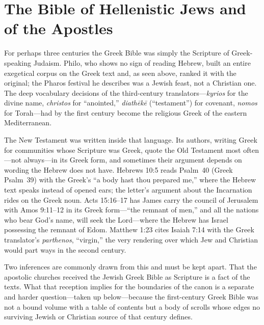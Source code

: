 \section{The Bible of Hellenistic Jews and of the Apostles}

For perhaps three centuries the Greek Bible was simply the Scripture of
Greek-speaking Judaism. Philo, who shows no sign of reading Hebrew, built
an entire exegetical corpus on the Greek text and, as seen above, ranked it
with the original; the Pharos festival he describes was a Jewish feast, not
a Christian one. The deep vocabulary decisions of the third-century
translators---\textit{kyrios} for the divine name, \textit{christos} for
``anointed,'' \textit{diath\=ek\=e} (``testament'') for covenant,
\textit{nomos} for Torah---had by the first century become the religious
Greek of the eastern Mediterranean.

The New Testament was written inside that language. Its authors, writing
Greek for communities whose Scripture was Greek, quote the Old Testament
most often---not always---in its Greek form, and sometimes their argument
depends on wording the Hebrew does not have. Hebrews 10:5 reads Psalm~40
(Greek Psalm~39) with the Greek's ``a body hast thou prepared me,'' where
the Hebrew text speaks instead of opened ears; the letter's argument about
the Incarnation rides on the Greek noun. Acts 15:16--17 has James carry the
council of Jerusalem with Amos 9:11--12 in its Greek form---``the remnant
of men,'' and all the nations who bear God's name, will seek the
Lord---where the Hebrew has Israel possessing the remnant of Edom.
Matthew 1:23 cites Isaiah 7:14 with the Greek
translator's \textit{parthenos}, ``virgin,'' the very rendering over which
Jew and Christian would part ways in the second
century.

Two inferences are commonly drawn from this and must be kept apart. That
the apostolic churches received the Jewish Greek Bible as Scripture is a
fact of the texts. What that reception implies for the boundaries of the
canon is a separate and harder question---taken up below---because the
first-century Greek Bible was not a bound volume with a table of contents
but a body of scrolls whose edges no surviving Jewish or Christian source
of that century defines.
